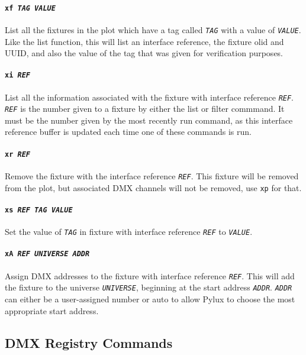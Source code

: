 \documentclass[a4paper]{article}
\begin{document}
\paragraph{\texttt{xf \textit{TAG VALUE}}}
List all the fixtures in the plot which have a tag called \texttt{\textit{TAG}} 
with a value of \texttt{\textit{VALUE}}. Like the list function, this will list 
an interface reference, the fixture olid and UUID, and also the value of the 
tag that was given for verification purposes.

\paragraph{\texttt{xi \textit{REF}}}
List all the information associated with the fixture with interface reference 
\texttt{\textit{REF}}. \texttt{\textit{REF}} is the number given to a fixture 
by either the list or filter commmand. It must be the number given by the most 
recently run command, as this interface reference buffer is updated each time 
one of these commands is run.

\paragraph{\texttt{xr \textit{REF}}}
Remove the fixture with the interface reference \texttt{\textit{REF}}. This 
fixture will be removed from the plot, but associated DMX channels will not be 
removed, use \texttt{xp} for that.

\paragraph{\texttt{xs \textit{REF TAG VALUE}}}
Set the value of \texttt{\textit{TAG}} in fixture with interface reference 
\texttt{\textit{REF}} to \texttt{\textit{VALUE}}.

\paragraph{\texttt{xA \textit{REF UNIVERSE ADDR}}}
Assign DMX addresses to the fixture with interface reference 
\texttt{\textit{REF}}. This will add the fixture to the universe 
\texttt{\textit{UNIVERSE}}, beginning at the start address 
\texttt{\textit{ADDR}}. \texttt{\textit{ADDR}} can either be a user-assigned 
number or auto to allow Pylux to choose the most appropriate start address.

\subsection{DMX Registry Commands}
\end{document}

